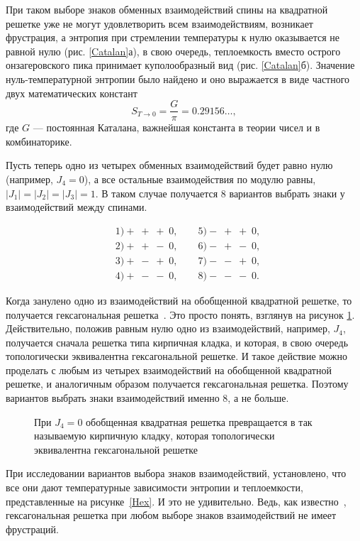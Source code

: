 При таком выборе знаков обменных взаимодействий спины на квадратной решетке уже не могут удовлетворить всем взаимодействиям, возникает фрустрация, а энтропия при стремлении температуры к нулю оказывается не равной нулю (рис. \ref{Catalan}а), в свою очередь, теплоемкость вместо острого онзагеровского пика принимает куполообразный вид (рис. \ref{Catalan}б). Значение нуль-температурной энтропии было найдено и оно выражается в виде частного двух математических констант
\begin{equation}
	S_{T\rightarrow 0} = \frac{G}{\pi} = 0.29156\dots,
	\label{g}
\end{equation} 
где $G$ --- постоянная Каталана, важнейшая константа в теории чисел и в комбинаторике.

Пусть теперь одно из четырех обменных взаимодействий будет равно нулю (например, $J_4 = 0$), а все остальные взаимодействия по модулю равны, $|J_1| = |J_2| = |J_3| = 1$. В таком случае получается 8 вариантов выбрать знаки у взаимодействий между спинами.

\begin{align*}
	&1) +\;+\;+\;0, \qquad   5) -\;+\;+\;0, \\
	&2) +\;+\;-\;0, \qquad  6) -\;+\;-\;0, \\
	&3) +\;-\;+\;0, \qquad  7) -\;-\;+\;0, \\
	&4) +\;-\;-\;0, \qquad  8) -\;-\;-\;0.
\end{align*}

Когда занулено одно из взаимодействий на обобщенной квадратной решетке, то получается гексагональная решетка~\cite{vakbib3}. Это просто понять, взглянув на рисунок \ref{hexTranf}. Действительно, положив равным нулю одно из взаимодействий, например, $J_4$, получается сначала решетка типа кирпичная кладка, и которая, в свою очередь топологически эквивалентна гексагональной решетке. И такое действие можно проделать с любым из четырех взаимодействий на обобщенной квадратной решетке, и аналогичным образом получается гексагональная решетка. Поэтому вариантов выбрать знаки взаимодействий именно 8, а не больше. 

\begin{figure}[h]
	\caption{При $J_4 = 0$ обобщенная квадратная решетка превращается в так называемую кирпичную кладку, которая топологически эквивалентна гексагональной решетке}
	\label{hexTranf}
\end{figure}

При исследовании вариантов выбора знаков взаимодействий, установлено, что все они дают температурные зависимости энтропии и теплоемкости, представленные на рисунке~\ref{Hex}. И это не удивительно. Ведь, как известно~\cite{houtapell1950}, гексагональная решетка при любом выборе знаков взаимодействий не имеет фрустраций.

